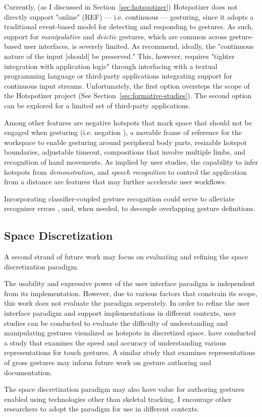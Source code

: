 Currently, (as I discussed in Section~\ref{sec:hotspotizer}) Hotspotizer does not directly support "online" (REF) --- i.e. continuous --- gesturing, since it adopts a traditional event-based model for detecting and responding to gestures. As such, support for \emph{manipulative} and \emph{deictic} gestures, which are common across gesture-based user interfaces, is severely limited. As \textcite{Myers:2000} recommend, ideally, the "continuous nature of the input [should] be preserved." This, however, requires "tighter integration with application logic" \parencite{Hartmann:2007} through interfacing with a textual programming language or third-party applications integrating support for continuous input streams. Unfortunately,  the first option oversteps the scope of the Hotspotizer project (See Section~\ref{sec:formative-studies}). The second option can be explored for a limited set of third-party applications.

Among other features are negative hotspots that mark space that should not be engaged when gesturing (i.e. negation \parencite{Hoste:2014}), a movable frame of reference for the workspace to enable gesturing around peripheral body parts, resizable hotspot boundaries, adjustable timeout, compositions that involve multiple limbs, and recognition of hand movements.  As implied by user studies, the capability to infer hotspots from \emph{demonstration}, and \emph{speech recognition} to control the application from a distance are features that may further accelerate user workflows.

Incorporating classifier-coupled gesture recognition \parencite{Hoste:2013} could serve to alleviate recognizer errors \parencite{Myers:2000}, and, when needed, to decouple overlapping gesture definitions.

\subsection{Space Discretization}

A second strand of future work may focus on evaluating and refining the space discretization paradigm.

The usability and expressive power of the user interface paradigm is independent from its implementation. However, due to various factors that constrain its scope, this work does not evaluate the paradigm seperately. In order to refine the user interface paradigm and support implementations in different contexts, user studies can be conducted to evaluate the difficulty of understanding and manipulating gestures visualized as hotspots in discretized space. \textcite{Kin:2002} have conducted a study that examines the speed and accuracy of understanding various representations for touch gestures. A similar study that examines representations of gross gestures may inform future work on gesture authoring and documentation.

The space discretization paradigm may also have value for authoring gestures enabled using technologies other than skeletal tracking. I encourage other researchers to adopt the paradigm for use in different contexts.
